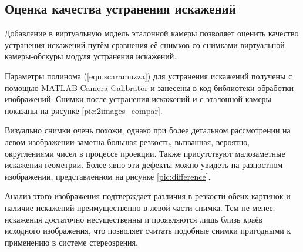 
\subsection{Оценка качества устранения искажений}

Добавление в виртуальную модель эталонной камеры позволяет оценить качество устранения искажений путём сравнения
её снимков со снимками виртуальной камеры-обскуры модуля устранения искажений. %

Параметры полинома (\ref{eqn:scaramuzza}) для устранения искажений получены с помощью MATLAB Camera Calibrator и занесены 
в код библиотеки обработки изображений. %
Снимки после устранения искажений и с эталонной камеры показаны на рисунке \ref{pic:2images_compar}.


Визуально снимки очень похожи, однако при более детальном рассмотрении на левом изображении заметна большая резкость, вызванная, 
вероятно, округлениями чисел в процессе проекции. Также присутствуют малозаметные искажения геометрии. Более 
явно эти дефекты можно увидеть на разностном изображении, представленном на рисунке \ref{pic:difference}. 


Анализ этого изображения подтверждает различия в резкости обеих картинок и наличие искажений преимущественно в левой части снимка. Тем не менее, искажения
достаточно несущественны и проявляются лишь близь краёв исходного изображения, что позволяет считать подобные снимки пригодными 
к применению в системе стереозрения.  